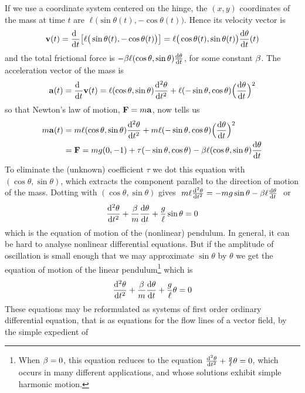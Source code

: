 If we use a coordinate system centered on the hinge, the $(x,y)$ 
coordinates of the mass at time $t$ are 
$\ell\big(\sin\theta(t),-\cos\theta(t)\big)$. 
Hence its  velocity vector is 
\begin{equation*}
\vv(t)
 = \diff{\ }{t}\big[\ell\big(\sin\theta(t),-\cos\theta(t)\big) \big]
  = \ell\big(\cos\theta(t),\sin\theta(t)\big)\diff{\theta}{t}(t)
\end{equation*}
and the  total frictional force is 
$-\be \ell(\cos\theta,\sin\theta)\diff{\theta}{t}$,
for some constant $\beta$.
The acceleration vector of the mass is
\begin{equation*}
\va(t)=\diff{\ }{t}\vv(t)
=\ell(\cos\theta,\sin\theta)\difftwo{\theta}{t}
+\ell(-\sin\theta,\cos\theta)\Big(\diff{\theta}{t}\Big)^2
\end{equation*}
so that Newton's law of motion, $\mathbf{F}=m\mathbf{a}$,  now tells us
\begin{align*}
m\va(t) &= m\ell(\cos\theta,\sin\theta)\difftwo{\theta}{t}
+m\ell(-\sin\theta,\cos\theta)\Big(\diff{\theta}{t}\Big)^2\\
&=\vF=mg(0,-1)+\tau (-\sin\theta,\cos\theta)
-\be \ell(\cos\theta,\sin\theta)\diff{\theta}{t}
\end{align*}
To eliminate the (unknown) coefficient $\tau$ we dot this equation with
$(\cos\theta,\sin\theta)$, which extracts 
the component parallel to the direction of motion of the 
mass. Dotting with $(\cos\theta,\sin\theta)$ gives
$\ 
m\ell\difftwo{\theta}{t}=-mg\sin\theta-\be \ell\diff{\theta}{t}
\ $
or
\begin{equation*}
\difftwo{\theta}{t}+\frac{\be}{m}\diff{\theta}{t}
              +\frac{g}{\ell}\sin\theta=0
\end{equation*}
which is the equation of motion of the (nonlinear) pendulum. 
In general, it can be hard to analyse nonlinear differential 
equations. But if the amplitude of oscillation is small enough 
that we may approximate 
$\sin\theta$ by $\theta$ we get the equation of motion 
of the linear pendulum\footnote{When $\beta=0$, this equation reduces
to the equation $\difftwo{\theta}{t}+\frac{g}{\ell}\theta=0$, which occurs 
in many different applications, and whose solutions exhibit simple 
harmonic motion.} which is 
\begin{align*}
\difftwo{\theta}{t}+\frac{\be}{m}\diff{\theta}{t}
+\frac{g}{\ell}\theta=0
\end{align*}
These equations may be reformulated as systems of first order 
ordinary differential equation, that is as equations for the 
flow lines of a vector field, by the simple expedient of 
